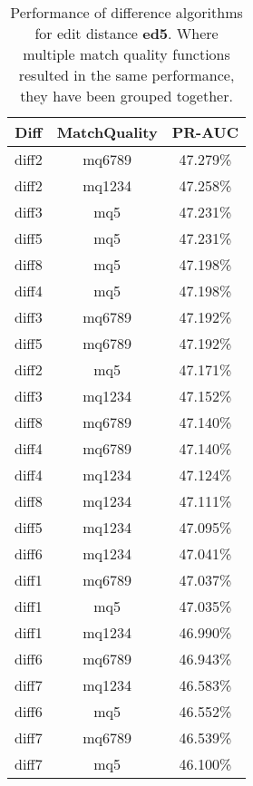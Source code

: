 \begin{table}[tbph]
\begin{center}
\begin{tabular}{|c|c||c|}
\hline
Diff & MatchQuality & PR-AUC  \\
\hline
\hline
diff2 & mq6789 & 47.279\% \\
diff2 & mq1234 & 47.258\% \\
diff3 & mq5 & 47.231\% \\
diff5 & mq5 & 47.231\% \\
diff8 & mq5 & 47.198\% \\
diff4 & mq5 & 47.198\% \\
diff3 & mq6789 & 47.192\% \\
diff5 & mq6789 & 47.192\% \\
diff2 & mq5 & 47.171\% \\
diff3 & mq1234 & 47.152\% \\
diff8 & mq6789 & 47.140\% \\
diff4 & mq6789 & 47.140\% \\
diff4 & mq1234 & 47.124\% \\
diff8 & mq1234 & 47.111\% \\
diff5 & mq1234 & 47.095\% \\
diff6 & mq1234 & 47.041\% \\
diff1 & mq6789 & 47.037\% \\
diff1 & mq5 & 47.035\% \\
diff1 & mq1234 & 46.990\% \\
diff6 & mq6789 & 46.943\% \\
diff7 & mq1234 & 46.583\% \\
diff6 & mq5 & 46.552\% \\
diff7 & mq6789 & 46.539\% \\
diff7 & mq5 & 46.100\% \\
\hline
\end{tabular}
\end{center}
\caption[Comparison of diff algorithms using edit distance \textbf{ed5}]{
  Performance of difference algorithms for
  edit distance \textbf{ed5}.  Where multiple match
  quality functions resulted in the same performance, they
  have been grouped together.}
\label{tab:editlongbyed5}
\end{table}
